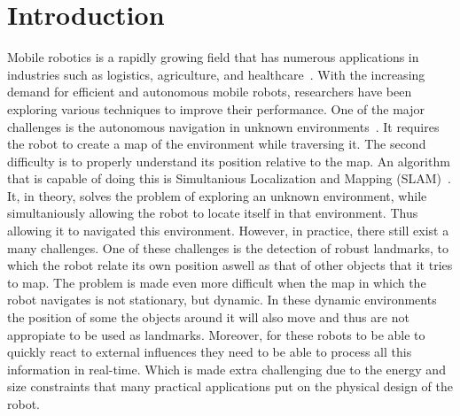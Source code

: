 \chapter{Introduction}\label{chapter:introduction}

Mobile robotics is a rapidly growing field that has numerous applications in industries such as logistics, agriculture, and healthcare~\cite{cognominal2021evolving,kebede2024review,clark2023amazon}. With the increasing demand for efficient and autonomous mobile robots, researchers have been exploring various techniques to improve their performance. One of the major challenges is the autonomous navigation in unknown environments~\cite{alatise2020review}. It requires the robot to create a map of the environment while traversing it. The second difficulty is to properly understand its position relative to the map. An algorithm that is capable of doing this is Simultanious Localization and Mapping (SLAM)~\cite{whyte1996slam,whyte2006slam}. It, in theory, solves the problem of exploring an unknown environment, while simultaniously allowing the robot to locate itself in that environment. Thus allowing it to navigated this environment. However, in practice, there still exist a many challenges. One of these challenges is the detection of robust landmarks, to which the robot relate its own position aswell as that of other objects that it tries to map. The problem is made even more difficult when the map in which the robot navigates is not stationary, but dynamic. In these dynamic environments the position of some the objects around it will also move and thus are not appropiate to be used as landmarks. Moreover, for these robots to be able to quickly react to external influences they need to be able to process all this information in real-time. Which is made extra challenging due to the energy and size constraints that many practical applications put on the physical design of the robot.

